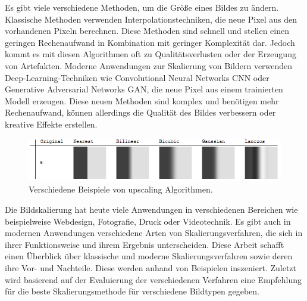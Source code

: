     Es gibt viele verschiedene Methoden, um die Größe eines Bildes zu ändern. 
    Klassische Methoden verwenden Interpolationstechniken, die neue Pixel aus den vorhandenen Pixeln berechnen. 
    Diese Methoden sind schnell und stellen einen geringen Rechenaufwand in Kombination mit geringer Komplexität dar. 
    Jedoch kommt es mit diesen Algorithmen oft zu Qualitätsverlusten oder der Erzeugung von Artefakten. 
    Moderne Anwendungen zur Skalierung von Bildern verwenden Deep-Learning-Techniken wie Convolutional Neural Networks \ac{CNN} oder Generative Adversarial Networks \ac{GAN}, die neue Pixel aus einem trainierten Modell erzeugen. 
    Diese neuen Methoden sind komplex und benötigen mehr Rechenaufwand, können allerdings die Qualität des Bildes verbessern oder kreative Effekte erstellen.
    
    \begin{figure}[h!]
        \vspace{8mm}
        \centering
        \includegraphics{img/xaR8r.png}
        \caption{Verschiedene Beispiele von upscaling Algorithmen\cite{whuber.lanczos}.}
        \label{fig:my_label}
        \vspace{4mm}
    \end{figure}
    
    Die Bildskalierung hat heute viele Anwendungen in verschiedenen Bereichen wie beispielweise Webdesign, Fotografie, Druck oder Videotechnik. 
    Es gibt auch in modernen Anwendungen verschiedene Arten von Skalierungsverfahren, die sich in ihrer Funktionsweise und ihrem Ergebnis unterscheiden. 
    Diese Arbeit schafft einen Überblick über klassische und moderne Skalierungsverfahren sowie deren ihre Vor- und Nachteile. 
    Diese werden anhand von Beispielen inszeniert. 
    Zuletzt wird basierend auf der Evaluierung der verschiedenen Verfahren eine Empfehlung für die beste Skalierungsmethode für verschiedene Bildtypen gegeben. 

